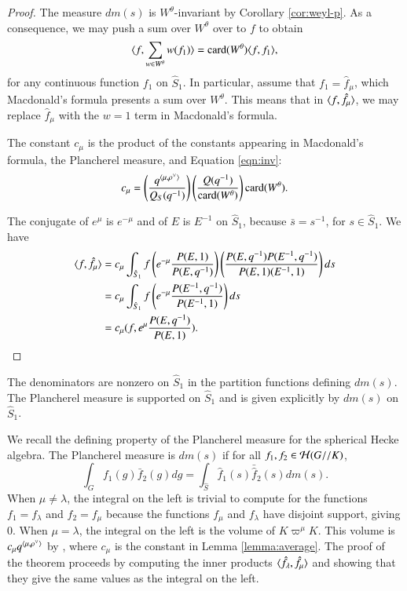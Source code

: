 \begin{proof}  
  The measure $dm(s)$ is $W^\theta$-invariant by Corollary
  \ref{cor:weyl-p}.  As a consequence, we may push a sum over
  $W^\theta$ over to $f$ to obtain
\begin{equation}\label{eqn:inv}
\langle{f,\sum_{w\in W^\theta} w(f_1)}\rangle = {\operatorname{card}}(W^\theta)\langle{f,f_1}\rangle,
\end{equation}
for any continuous function $f_1$ on $\hat S_1$.
In particular, assume that $f_1=\hat f_\mu$, which Macdonald's
formula presents a sum over $W^\theta$.
This means that in $\langle{f,\hat f_\mu}\rangle$, we may replace 
$\hat f_\mu$  with
the $w=1$ term  in Macdonald's formula.

The constant $c_\mu$ is the product of the constants appearing in
Macdonald's formula, the Plancherel measure, and Equation
\ref{eqn:inv}:
\[
c_\mu = \left(\frac{q^{\langle{\mu,\rho^\vee}\rangle}}{Q_S(q^{-1})}\right)
\left(\frac{Q(q^{-1})}{{\operatorname{card}}(W^\theta)}\right) {\operatorname{card}}(W^\theta).
\]

The conjugate of $e^\mu$ is $e^{-\mu}$ and of $E$ is $E^{-1}$ on $\hat
S_1$, because $\bar s = s^{-1}$, for $s\in \hat S_1$.  We have
\begin{align*}
\langle{f,\hat f_\mu}\rangle &=
c_\mu\int_{\hat S_1} f \left(e^{-\mu}
                     \frac{P(E,1)}{P(E,q^{-1})}\right) 
\left(\frac{P(E,q^{-1}) P(E^{-1},q^{-1})}{P(E,1)(E^{-1},1)}\right) ds\\
&=
c_\mu\int_{\hat S_1} f \left(e^{-\mu} 
\frac{P(E^{-1},q^{-1})}{P(E^{-1},1)}\right) ds\\
&=
c_\mu (f, e^\mu\frac{ P(E,q^{-1})}{P(E,1)}).
\end{align*}
\end{proof}

\begin{theorem}
  The denominators are nonzero on $\hat S_1$ in the partition
  functions defining $dm(s)$.  The Plancherel measure is supported on
  $\hat S_1$ and is given explicitly by $dm(s)$ on $\hat S_1$.
\end{theorem}

\begin{remark}
  We recall the defining property of the Plancherel measure for the
  spherical Hecke algebra.  The Plancherel measure is $dm(s)$ if for
  all $f_1,f_2\in \mathcal H(G//K)$,
\[
\int_G f_1(g) \bar f_2 (g) dg = \int_{\hat S} \hat f_1(s) \bar {\hat f}_2 (s) dm(s).
\]
When $\mu\ne\lambda$, the integral on the left is trivial to compute
for the functions $f_1 = f_\lambda$ and $f_2 = f_\mu$ because the
functions $f_\mu$ and $f_\lambda$ have disjoint support, giving $0$.
When $\mu=\lambda$, the integral on the left is the volume of
$K\varpi^\mu K$.  This volume is $c_\mu q^{\langle{\mu,\rho^\vee}\rangle}$ by
\cite{casselman2005companion}, where $c_\mu$ is the constant in Lemma
\ref{lemma:average}.  The proof of the theorem proceeds by computing
the inner products $\langle{\hat f_\lambda,\hat f_\mu}\rangle$ and showing that
they give the same values as the integral on the left.
\end{remark}

